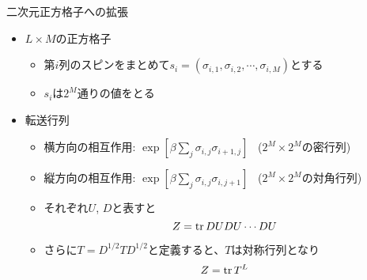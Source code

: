 \begin{frame}[t,fragile]{二次元正方格子への拡張}
  \begin{itemize}
    \setlength{\itemsep}{1em}
  \item $L \times M$の正方格子
    \begin{itemize}
    \item 第$i$列のスピンをまとめて$s_i = ( \sigma_{i,1}, \sigma_{i,2}, \cdots, \sigma_{i,M})$とする
    \item $s_i$は$2^M$通りの値をとる
    \end{itemize}
  \item 転送行列
    \begin{itemize}
    \item 横方向の相互作用: $\exp[\beta \sum_j \sigma_{i,j} \sigma_{i+1,j}]$ \ ($2^M \times 2^M$の密行列)
    \item 縦方向の相互作用: $\exp[\beta \sum_j \sigma_{i,j} \sigma_{i,j+1}]$ \ ($2^M \times 2^M$の対角行列)
    \item それぞれ$U$, $D$と表すと
      \[
      Z = {\rm tr} \, DUDU \cdots DU
      \]
    \item さらに$T=D^{1/2}TD^{1/2}$と定義すると、$T$は対称行列となり
      \[
      Z = {\rm tr} \, T^L
      \]
    \end{itemize}
  \end{itemize}
\end{frame}
